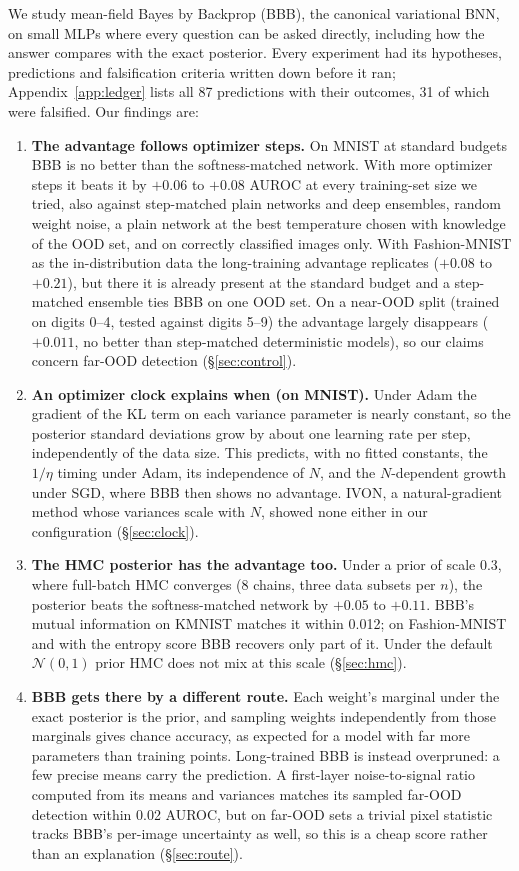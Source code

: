 \documentclass[10pt]{article}
\begin{document}
We study mean-field Bayes by Backprop (BBB), the canonical variational BNN,
on small MLPs where every question can be asked directly, including how the
answer compares with the exact posterior. Every experiment had its
hypotheses, predictions and falsification criteria written down before it
ran; Appendix~\ref{app:ledger} lists all 87 predictions with their outcomes,
31 of which were falsified. Our findings are:
\begin{enumerate}
\item \textbf{The advantage follows optimizer steps.} On MNIST at standard
budgets BBB is no better than the softness-matched network. With more
optimizer steps it beats it by $+0.06$ to $+0.08$ AUROC at every training-set
size we tried, also against step-matched plain networks and deep ensembles,
random weight noise, a plain network at the best temperature chosen with
knowledge of the OOD set, and on correctly classified images only. With
Fashion-MNIST as the in-distribution data the long-training advantage
replicates ($+0.08$ to $+0.21$), but there it is already present at the
standard budget and a step-matched ensemble ties BBB on one OOD set. On a
near-OOD split (trained on digits 0--4, tested against digits 5--9) the
advantage largely disappears ($+0.011$, no better than step-matched
deterministic models), so our claims concern far-OOD detection
(\S\ref{sec:control}).
\item \textbf{An optimizer clock explains when (on MNIST).} Under Adam the gradient of the
KL term on each variance parameter is nearly constant, so the posterior
standard deviations grow by about one learning rate per step, independently of
the data size. This predicts, with no fitted constants, the $1/\eta$ timing
under Adam, its independence of $N$, and the $N$-dependent growth under SGD,
where BBB then shows no advantage. IVON, a natural-gradient method whose
variances scale with $N$, showed none either in our configuration
(\S\ref{sec:clock}).
\item \textbf{The HMC posterior has the advantage too.} Under a prior of
scale 0.3, where full-batch HMC converges (8 chains, three data subsets per
$n$), the posterior beats the softness-matched network by $+0.05$ to $+0.11$.
BBB's mutual information on KMNIST matches it within 0.012; on Fashion-MNIST
and with the entropy score BBB recovers only part of it. Under the default
$\mathcal N(0,1)$ prior HMC does not mix at this scale (\S\ref{sec:hmc}).
\item \textbf{BBB gets there by a different route.} Each weight's marginal
under the exact posterior is the prior, and sampling weights independently
from those marginals gives chance accuracy, as expected for a model with far
more parameters than training points. Long-trained BBB is instead overpruned:
a few precise means carry the prediction. A first-layer noise-to-signal
ratio computed from its means and variances matches its sampled far-OOD
detection within 0.02 AUROC, but on far-OOD sets a trivial pixel statistic
tracks BBB's per-image uncertainty as well, so this is a cheap score rather
than an explanation (\S\ref{sec:route}).
\end{enumerate}
\end{document}
